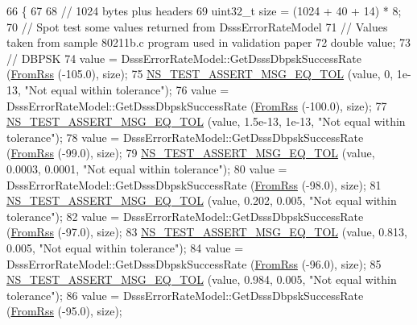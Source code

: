 \begin{DoxyCode}
66 \{
67 
68   \textcolor{comment}{// 1024 bytes plus headers}
69   uint32\_t size = (1024 + 40 + 14) * 8;
70   \textcolor{comment}{// Spot test some values returned from DsssErrorRateModel}
71   \textcolor{comment}{// Values taken from sample 80211b.c program used in validation paper}
72   \textcolor{keywordtype}{double} value;
73   \textcolor{comment}{// DBPSK}
74   value = DsssErrorRateModel::GetDsssDbpskSuccessRate (\hyperlink{wifi-error-rate-models-test_8cc_a04e29db50fb1c1d787cf553ee9453e90}{FromRss} (-105.0), size);
75   \hyperlink{group__testing_ga9e7861b56b4e70db3b56044cb7a28e41}{NS\_TEST\_ASSERT\_MSG\_EQ\_TOL} (value, 0, 1e-13, \textcolor{stringliteral}{"Not equal within tolerance"});
76   value = DsssErrorRateModel::GetDsssDbpskSuccessRate (\hyperlink{wifi-error-rate-models-test_8cc_a04e29db50fb1c1d787cf553ee9453e90}{FromRss} (-100.0), size);
77   \hyperlink{group__testing_ga9e7861b56b4e70db3b56044cb7a28e41}{NS\_TEST\_ASSERT\_MSG\_EQ\_TOL} (value, 1.5e-13, 1e-13, \textcolor{stringliteral}{"Not equal within tolerance"});
78   value = DsssErrorRateModel::GetDsssDbpskSuccessRate (\hyperlink{wifi-error-rate-models-test_8cc_a04e29db50fb1c1d787cf553ee9453e90}{FromRss} (-99.0), size);
79   \hyperlink{group__testing_ga9e7861b56b4e70db3b56044cb7a28e41}{NS\_TEST\_ASSERT\_MSG\_EQ\_TOL} (value, 0.0003, 0.0001, \textcolor{stringliteral}{"Not equal within tolerance"});
80   value = DsssErrorRateModel::GetDsssDbpskSuccessRate (\hyperlink{wifi-error-rate-models-test_8cc_a04e29db50fb1c1d787cf553ee9453e90}{FromRss} (-98.0), size);
81   \hyperlink{group__testing_ga9e7861b56b4e70db3b56044cb7a28e41}{NS\_TEST\_ASSERT\_MSG\_EQ\_TOL} (value, 0.202, 0.005, \textcolor{stringliteral}{"Not equal within tolerance"});
82   value = DsssErrorRateModel::GetDsssDbpskSuccessRate (\hyperlink{wifi-error-rate-models-test_8cc_a04e29db50fb1c1d787cf553ee9453e90}{FromRss} (-97.0), size);
83   \hyperlink{group__testing_ga9e7861b56b4e70db3b56044cb7a28e41}{NS\_TEST\_ASSERT\_MSG\_EQ\_TOL} (value, 0.813, 0.005, \textcolor{stringliteral}{"Not equal within tolerance"});
84   value = DsssErrorRateModel::GetDsssDbpskSuccessRate (\hyperlink{wifi-error-rate-models-test_8cc_a04e29db50fb1c1d787cf553ee9453e90}{FromRss} (-96.0), size);
85   \hyperlink{group__testing_ga9e7861b56b4e70db3b56044cb7a28e41}{NS\_TEST\_ASSERT\_MSG\_EQ\_TOL} (value, 0.984, 0.005, \textcolor{stringliteral}{"Not equal within tolerance"});
86   value = DsssErrorRateModel::GetDsssDbpskSuccessRate (\hyperlink{wifi-error-rate-models-test_8cc_a04e29db50fb1c1d787cf553ee9453e90}{FromRss} (-95.0), size);

\end{DoxyCode}
